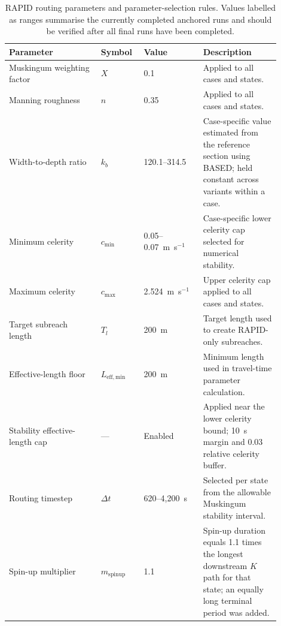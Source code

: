 \begin{table}[t]
\centering
\caption{RAPID routing parameters and parameter-selection rules. Values labelled as ranges summarise the currently completed anchored runs and should be verified after all final runs have been completed.}
\label{tab:routing_parameters}
\begin{tabular}{p{0.31\linewidth}p{0.13\linewidth}p{0.20\linewidth}p{0.26\linewidth}}
\hline
Parameter & Symbol & Value & Description \\
\hline
Muskingum weighting factor & $X$ & 0.1 & Applied to all cases and states. \\
Manning roughness & $n$ & 0.35 & Applied to all cases and states. \\
Width-to-depth ratio & $k_b$ & 120.1--314.5 & Case-specific value estimated from the reference section using BASED; held constant across variants within a case. \\
Minimum celerity & $c_{\min}$ & 0.05--0.07~m~s$^{-1}$ & Case-specific lower celerity cap selected for numerical stability. \\
Maximum celerity & $c_{\max}$ & 2.524~m~s$^{-1}$ & Upper celerity cap applied to all cases and states. \\
Target subreach length & $T_l$ & 200~m & Target length used to create RAPID-only subreaches. \\
Effective-length floor & $L_{\mathrm{eff,min}}$ & 200~m & Minimum length used in travel-time parameter calculation. \\
Stability effective-length cap & --- & Enabled & Applied near the lower celerity bound; 10~s margin and 0.03 relative celerity buffer. \\
Routing timestep & $\Delta t$ & 620--4,200~s & Selected per state from the allowable Muskingum stability interval. \\
Spin-up multiplier & $m_{\mathrm{spinup}}$ & 1.1 & Spin-up duration equals 1.1 times the longest downstream $K$ path for that state; an equally long terminal period was added. \\
\hline
\end{tabular}
\end{table}

